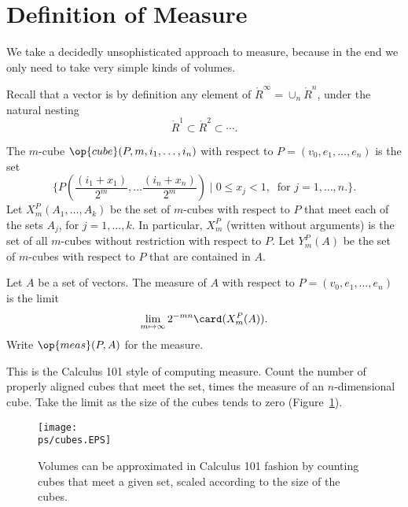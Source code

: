 

\def\aspan#1{{\langle #1\rangle}}

\section{Definition of Measure}

We take a decidedly unsophisticated approach to measure, because in
the end we only need to take very simple kinds of volumes.

Recall that a vector is by definition any element of
$\ring{R}^\infty = \cup_n \ring{R}^n$, under the natural nesting
    $$\ring{R}^1 \subset \ring{R}^2 \subset \cdots.$$


\begin{definition}
    The $m$-cube  $\op{cube}(P,m,i_1,\ldots,i_n)$
    with respect to $P=(v_0,e_1,\ldots,e_n)$ is the
    set
        $$\{P(\frac{(i_1+x_1)}{2^m},\ldots\frac{(i_n+x_n)}{2^m}) \mid 0 \le
        x_j
        < 1,\ \text{ for } j=1,\ldots,n.\}.$$
Let $X^P_m(A_1,\ldots,A_k)$ be the set of $m$-cubes with respect to
$P$ that meet each of the sets $A_j$, for $j=1,\ldots,k$.  In
particular, $X^P_m$ (written without arguments) is the set of all
$m$-cubes without restriction with respect to $P$. Let $Y^P_m(A)$ be
the set of $m$-cubes with respect to $P$ that are contained in $A$.
\end{definition}

\begin{definition}
    Let $A$ be a set of vectors.  The measure of $A$ with respect to
        $P=(v_0,e_1,\ldots,e_n)$ is the limit
    \begin{equation}\label{eqn:measure}
    \lim_{m\mapsto\infty} 2^{-m n}\card(X^P_m(A)).
    \end{equation}
    Write $\op{meas} (P,A)$ for the measure.
\end{definition}

This is the Calculus 101 style of computing measure.  Count the
number of properly aligned cubes that meet the set, times the
measure of an $n$-dimensional cube.  Take the limit as the size of
the cubes tends to zero  (Figure~\ref{fig:cubes}).

\begin{figure}[htb]
  \centering
  \texttt{[image: \\ps/cubes.EPS]}
  \caption{Volumes can be approximated in Calculus
  101 fashion by counting cubes
   that meet a given set, scaled according to the size of the cubes.}
  \label{fig:cubes}
\end{figure}




